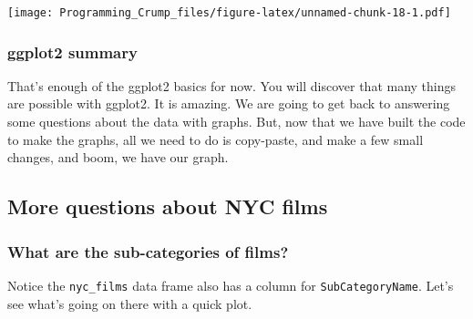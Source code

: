 \documentclass[]{book}
\theoremstyle{definition}
\theoremstyle{definition}
\theoremstyle{definition}
\theoremstyle{remark}
\begin{document}
\texttt{[image: Programming\_Crump\_files/figure-latex/unnamed-chunk-18-1.pdf]}

\subsubsection{ggplot2 summary}\label{ggplot2-summary}

That's enough of the ggplot2 basics for now. You will discover that many
things are possible with ggplot2. It is amazing. We are going to get
back to answering some questions about the data with graphs. But, now
that we have built the code to make the graphs, all we need to do is
copy-paste, and make a few small changes, and boom, we have our graph.

\subsection{More questions about NYC
films}\label{more-questions-about-nyc-films}

\subsubsection{What are the sub-categories of
films?}\label{what-are-the-sub-categories-of-films}

Notice the \texttt{nyc\_films} data frame also has a column for
\texttt{SubCategoryName}. Let's see what's going on there with a quick
plot.
\end{document}
